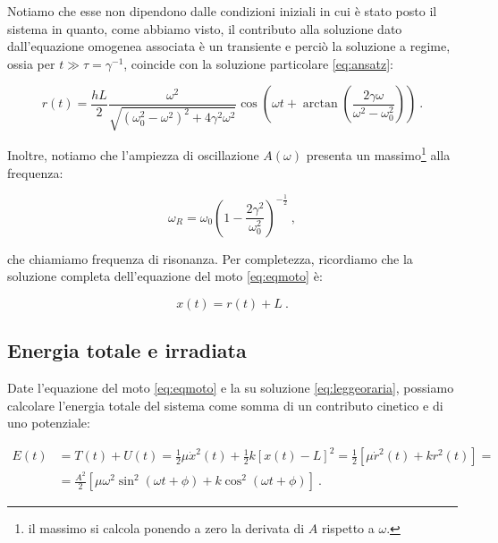 \documentclass[a4paper,10pt]{article}
\begin{document}
Notiamo che esse non dipendono dalle condizioni iniziali in cui è stato posto il sistema in quanto, come abbiamo visto, il contributo alla soluzione dato dall'equazione omogenea associata è un transiente e perciò la soluzione a regime, ossia per $t \gg \tau = \gamma^{-1}$, coincide con la soluzione particolare \eqref{eq:ansatz}:

\begin{equation}
    r(t) = \dfrac{hL}{2} \dfrac{\omega^2}{\sqrt{(\omega_0^2 - \omega^2)^2 + 4 \gamma^2 \omega^2}} \cos \left( \omega t + \arctan \left( \dfrac{2 \gamma \omega}{\omega^2 - \omega_0^2} \right) \right) \ .
\end{equation}

Inoltre, notiamo che l'ampiezza di oscillazione $A(\omega)$ presenta un massimo\footnote{il massimo si calcola ponendo a zero la derivata di $A$ rispetto a $\omega$.} alla frequenza:

\begin{equation} \label{eq:wrisonanza}
    \omega_R = \omega_0 \left( 1 - \frac{2 \gamma^2}{\omega_0^2} \right)^{-\frac{1}{2}} \ ,
\end{equation}

che chiamiamo frequenza di risonanza.
Per completezza, ricordiamo che la soluzione completa dell'equazione del moto \eqref{eq:eqmoto} è:

\begin{equation} \label{eq:leggeoraria}
    x(t) = r(t) + L \ .
\end{equation}





\subsection{Energia totale e irradiata}

Date l'equazione del moto \eqref{eq:eqmoto} e la su soluzione \eqref{eq:leggeoraria}, possiamo calcolare l'energia totale del sistema come somma di un contributo cinetico e di uno potenziale:

\begin{equation} \label{eq:energia}
\begin{aligned}
    E(t)    &= T(t) + U(t) = \frac{1}{2} \mu \dot x^2(t) + \frac{1}{2} k [x(t) - L]^2 = \frac{1}{2} [\mu \dot r^2(t) + k r^2(t)] = \\
            &= \frac{A^2}{2} [\mu \omega^2 \sin^2(\omega t + \phi) + k \cos^2(\omega t + \phi)] \ .
\end{aligned}
\end{equation}
\end{document}
